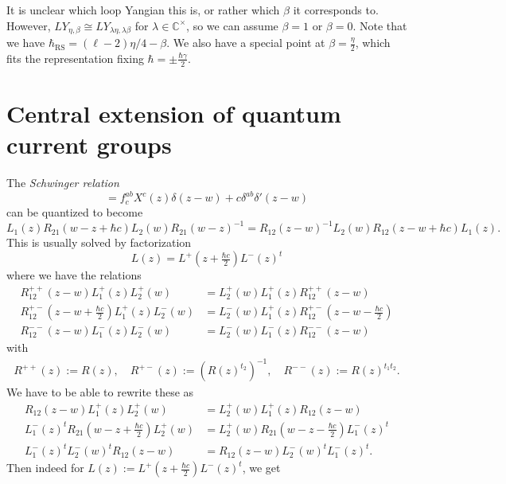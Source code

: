 \documentclass[11pt]{report}
\theoremstyle{definition}
\theoremstyle{remark}
\theoremstyle{remark}
\newcommand{\C}{\mathbb{C}}
\begin{document}
It is unclear which loop Yangian this is, or rather which $\beta$ it corresponds to. However, $LY_{\eta,\beta} \cong LY_{\lambda\eta,\lambda\beta}$ for $\lambda \in \C^\times$, so we can assume $\beta = 1$ or $\beta = 0$. Note that we have $\hbar_\text{RS} = (\ell-2) \eta/4-\beta$. We also have a special point at $\beta = \frac{\eta}{2}$, which fits the representation fixing $\hbar = \pm \frac{\hbar\gamma}{2}$.

\section{Central extension of quantum current groups}

The \emph{Schwinger relation}
\begin{equation*}
[X^a(z),X^b(w)] = f_c^{ab} X^c(z) \delta(z-w) + c \delta^{ab} \delta'(z-w)
\end{equation*}
can be quantized to become
\begin{equation*}
L_1(z) R_{21}(w-z+\hbar c) L_2(w) R_{21}(w-z)^{-1} = R_{12}(z-w)^{-1} L_2(w) R_{12}(z-w+\hbar c) L_1(z).
\end{equation*}
This is usually solved by factorization
\begin{equation*}
L(z) = L^+(z+\tfrac{\hbar c}{2}) L^-(z)^t
\end{equation*}
where we have the relations
\begin{align*}
R_{12}^{++}(z-w) L_1^+(z) L_2^+(w) &= L_2^+(w) L_1^+(z) R_{12}^{++}(z-w) \\
R_{12}^{+-}(z-w+\tfrac{\hbar c}{2}) L_1^+(z) L_2^-(w) &= L_2^-(w) L_1^+(z) R_{12}^{+-}(z-w-\tfrac{\hbar c}{2}) \\
R_{12}^{--}(z-w) L_1^-(z) L_2^-(w) &= L_2^-(w) L_1^-(z) R_{12}^{--}(z-w)
\end{align*}
with
\begin{align*}
R^{++}(z) := R(z), \quad R^{+-}(z) := (R(z)^{t_2})^{-1}, \quad R^{--}(z) := R(z)^{t_1 t_2}.
\end{align*}
We have to be able to rewrite these as
\begin{align*}
R_{12}(z-w) L_1^+(z) L_2^+(w) &= L_2^+(w) L_1^+(z) R_{12}(z-w) \\
L_1^-(z)^t R_{21}(w-z+\tfrac{\hbar c}{2}) L_2^+(w) &= L_2^+(w) R_{21}(w-z-\tfrac{\hbar c}{2}) L_1^-(z)^t \\
L_1^-(z)^t L_2^-(w)^t R_{12}(z-w) &= R_{12}(z-w) L_2^-(w)^t L_1^-(z)^t.
\end{align*}
Then indeed for $L(z) := L^+(z+\tfrac{\hbar c}{2}) L^-(z)^t$, we get
\end{document}
